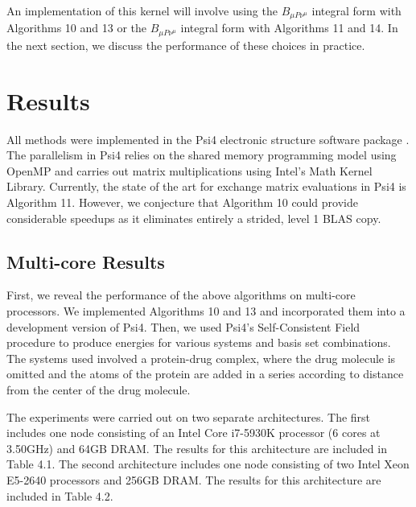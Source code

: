 \noindent An implementation of this kernel will involve using the $B_{\mu P \nu^\mu}$ integral form with Algorithms 10 and 13 or the 
$B_{\mu P \nu^\mu}$ integral form with Algorithms 11 and 14. In the next section, we discuss the performance of these choices in practice.

\section{Results}

All methods were implemented in the {\sc Psi4} electronic structure software package \cite{Parrish:2017:3185}.
The parallelism in {\sc Psi4} relies on the shared memory programming model using OpenMP 
and carries out matrix multiplications using Intel's Math Kernel
Library. Currently, the state of the art for exchange matrix evaluations in
{\sc Psi4} is Algorithm 11. However, we conjecture that Algorithm 10 could provide 
considerable speedups as it eliminates entirely a strided, level 1 BLAS copy. 

\subsection{Multi-core Results}

First, we reveal the performance of the above algorithms on multi-core processors.
We implemented Algorithms 10 and 13 and incorporated them into a development version of {\sc Psi4}. 
Then, we used {\sc Psi4}'s Self-Consistent Field
procedure to produce energies for various systems and basis set combinations. The systems used involved a protein-drug complex,
where the drug molecule is omitted and the atoms of the protein are added in a series according to distance from the center of
the drug molecule. 

The experiments were carried out on two separate architectures. The first includes one node consisting of an Intel Core i7-5930K processor
(6 cores at 3.50GHz) and 64GB DRAM. The results for this architecture are included in Table 4.1. The second architecture includes one node consisting
of two Intel Xeon E5-2640 processors and 256GB DRAM. The results for this architecture are included in Table 4.2. 


